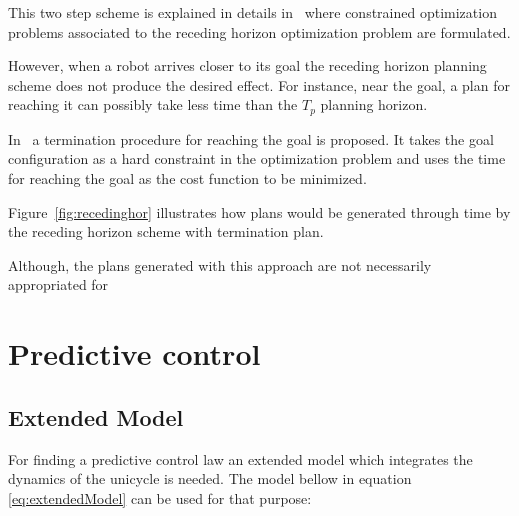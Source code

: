 \documentclass[letterpaper, 10 pt, conference]{ieeeconf}  %
\begin{document}
This two step scheme is explained in details in~\cite{Defoort2009} where constrained optimization problems associated to the receding horizon 
optimization problem are formulated.

However, when a robot arrives closer to its goal the receding horizon planning scheme does not produce the desired effect. For instance, near the goal, a plan for reaching it can possibly take less time than the $T_p$ planning horizon. 

In~\cite{MendesFilho2015} a termination procedure for reaching the goal is proposed. It takes the goal configuration as a hard constraint in the optimization problem and uses the time for reaching the goal as the cost function to be minimized.

Figure~\ref{fig:recedinghor} illustrates how plans would be generated through time by the receding horizon scheme with termination plan.


Although, the plans generated with this approach are not necessarily appropriated for 



\mbox{}


\clearpage

\section{Predictive control}

\subsection{Extended Model}

For finding a predictive control law an extended model which integrates the dynamics of the unicycle is needed. The model bellow in equation \ref{eq:extendedModel} can be used for that purpose:
\end{document}
